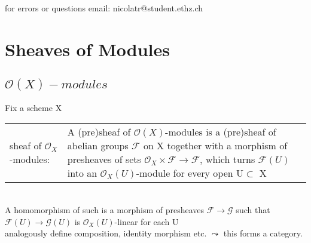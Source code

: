 \documentclass[a4paper, 12pt]{article}
\newcommand{\ca}[1]{\mathcal{#1}}
\newcommand{\oxmods}{$\mathcal{O}_X$-modules}
\begin{document}
\setcounter{section}{4}

for errors or questions email: nicolatr@student.ethz.ch

\section{Sheaves of Modules}
\subsection{$\mathcal{O}(X)-modules$}
Fix a scheme X
\\






\begin{tabular}{p{4cm} p{11cm}}


sheaf of \oxmods: & A (pre)sheaf of  $\mathcal{O}(X)$-modules is a (pre)sheaf of abelian groups $\mathcal{F}$ on X together with a morphism of presheaves of sets $\mathcal{O}_X\times\mathcal{F}\longrightarrow\mathcal{F}$, which turns $\mathcal{F}(U)$ into an $\mathcal{O}_X(U)$-module for every open U$\subset$ X
\\

\end{tabular}
\\

A homomorphism of such is a morphism of presheaves $\mathcal{F}\rightarrow\mathcal{G}$ such that $\mathcal{F}(U)\rightarrow\mathcal{G}(U)$ is $\ca{O}_X(U)$-linear for each U
\\

analogously define composition, identity morphism etc. $\leadsto$ this forms a category.
\\
\end{document}
